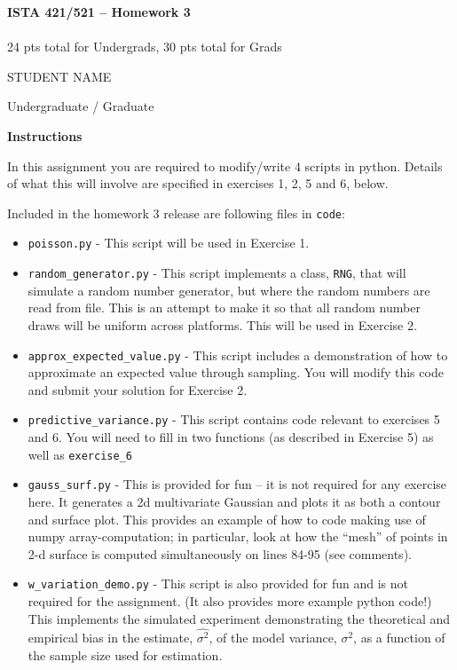 \documentclass[10pt]{article}
\begin{document}
\begin{center}
    {\Large {\bf ISTA 421/521 -- Homework 3}} \\
     \\
    24 pts total for Undergrads, 30 pts total for Grads
    
\end{center}

\begin{flushright}
STUDENT NAME %

Undergraduate / Graduate %
\end{flushright}

\vspace{1cm}
{\Large {\bf Instructions}}

In this assignment you are required to modify/write 4 scripts in python.  Details of what this will involve are specified in exercises 1, 2, 5 and 6, below.

Included in the homework 3 release are following files in {\tt code}:
\begin{itemize}
\item{\tt poisson.py} - This script will be used in Exercise 1.
\item{\tt random\_generator.py} - This script implements a class, {\tt RNG}, that will simulate a random number generator, but where the random numbers are read from file. This is an attempt to make it so that all random number draws will be uniform across platforms. This will be used in Exercise 2.
\item {\tt approx\_expected\_value.py} - This script includes a demonstration of how to approximate an expected value through sampling.  You will modify this code and submit your solution for Exercise 2.
\item {\tt predictive\_variance.py} - This script contains code relevant to exercises 5 and 6. You will need to fill in two functions (as described in Exercise 5) as well as {\tt exercise\_6}
\item {\tt gauss\_surf.py} - This is provided for fun -- it is not required for any exercise here. It generates a 2d multivariate Gaussian and plots it as both a contour and surface plot. This provides an example of how to code making use of numpy array-computation; in particular, look at how the ``mesh'' of points in 2-d surface is computed simultaneously on lines 84-95 (see comments).
\item {\tt w\_variation\_demo.py} - This script is also provided for fun and is not required for the assignment. (It also provides more example python code!)  This implements the simulated experiment demonstrating the theoretical and empirical bias in the estimate, $\widehat{\sigma^2}$, of the model variance, $\sigma^2$, as a function of the sample size used for estimation.
\end{itemize}
\end{document}

